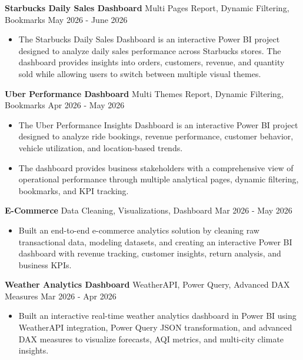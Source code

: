\documentclass[11pt,letterpaper]{article}
\begin{document}
\textbf{Starbucks Daily Sales Dashboard} \textbar{} {Multi Pages Report, Dynamic Filtering, Bookmarks} \textbar{} \hfill May 2026 - June 2026
\begin{itemize}
    \item  The Starbucks Daily Sales Dashboard is an interactive Power BI project designed to analyze daily sales performance across Starbucks stores. The dashboard provides insights into orders, customers, revenue, and quantity sold while allowing users to switch between multiple visual themes.
\end{itemize}
\newline
\textbf{Uber Performance Dashboard} \textbar{} {Multi Themes Report, Dynamic Filtering, Bookmarks} \textbar{} \hfill Apr 2026 - May 2026
\begin{itemize}
    \item  The Uber Performance Insights Dashboard is an interactive Power BI project designed to analyze ride bookings, revenue performance, customer behavior, vehicle utilization, and location-based trends.
    \item The dashboard provides business stakeholders with a comprehensive view of operational performance through multiple analytical pages, dynamic filtering, bookmarks, and KPI tracking.
\end{itemize}
\newline
\noindent
\textbf{E-Commerce} \textbar{} {Data Cleaning, Visualizations, Dashboard} \textbar{} \hfill Mar 2026 - May 2026
\begin{itemize}
    \item  Built an end-to-end e-commerce analytics solution by cleaning raw transactional data, modeling datasets, and creating an interactive Power BI dashboard with revenue tracking, customer insights, return analysis, and business KPIs.
\end{itemize}
\newline
\textbf{Weather Analytics Dashboard} \textbar{} {WeatherAPI, Power Query, Advanced DAX Measures} \textbar{} \hfill Mar 2026 - Apr 2026
\begin{itemize}
    \item  Built an interactive real-time weather analytics dashboard in Power BI using WeatherAPI integration, Power Query JSON transformation, and advanced DAX measures to visualize forecasts, AQI metrics, and multi-city climate insights.
\end{itemize}


    
\end{document}

